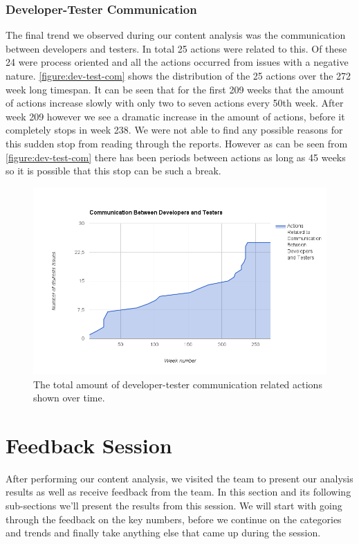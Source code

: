 \subsubsection{Developer-Tester Communication}
The final trend we observed during our content analysis was the communication between developers and testers. In total 25 actions were related to this. Of these 24 were process oriented and all the actions occurred from issues with a negative nature. 
\autoref{figure:dev-test-com} shows the distribution of the 25 actions over the 272 week long timespan. It can be seen that for the first 209 weeks that the amount of actions increase slowly with only two to seven actions every 50th week. After week 209 however we see a dramatic increase in the amount of actions, before it completely stops in week 238. We were not able to find any possible reasons for this sudden stop from reading through the reports. However as can be seen from \autoref{figure:dev-test-com} there has been periods between actions as long as 45 weeks so it is possible that this stop can be such a break.  

\begin{figure}[!h]
	\centering
	\includegraphics[width=\textwidth, keepaspectratio]{figures/devtestcom.png}
	\caption{The total amount of developer-tester communication related actions shown over time.}
	\label{figure:dev-test-com}
\end{figure}

\clearpage

\section{Feedback Session}
After performing our content analysis, we visited the team to present our analysis results as well as receive feedback from the team. In this section and its following sub-sections we'll present the results from this session. We will start with going through the feedback on the key numbers, before we continue on the categories and trends and finally take anything else that came up during the session. 

